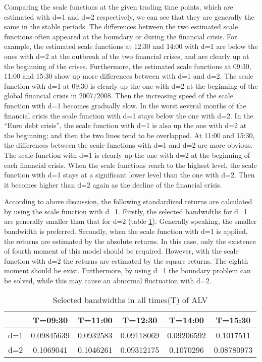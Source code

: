 Comparing the scale functions at the given trading time points, which are estimated with d=1 and d=2 respectively, we can see that they are generally the same in the stable periods. The differences between the two estimated scale functions often appeared at the boundary or during the financial crisis. For example, the estimated scale functions at 12:30 and 14:00 with d=1 are below the ones with d=2 at the outbreak of the two financial crises, and are clearly up at the beginning of the crises. 
Furthermore, the estimated scale functions at 09:30, 11:00 and 15:30 show up more differences between with d=1 and d=2. The scale function with d=1 at 09:30 is clearly up the one with d=2 at the beginning of the global financial crisis in 2007/2008. Then the increasing speed of the scale function with d=1 becomes gradually slow. In the worst several months of the financial crisis the scale function with d=1 stays below the one with d=2. In the ``Euro debt crisis'', the scale function with d=1 is also up the one with d=2 at the beginning; and then the two lines tend to be overlapped. At 11:00 and 15:30, the differences between the scale functions with d=1 and d=2 are more obvious. The scale function with d=1 is clearly up the one with d=2 at the beginning of each financial crisis. When the scale functions reach to the highest level, the scale function with d=1 stays at a significant lower level than the one with d=2. Then it becomes higher than d=2 again as the decline of the financial crisis.

According to above discussion, the following standardized returns are calculated by using the scale function with d=1. Firstly, the selected bandwidths for d=1 are generally smaller than that for d=2 (table \ref{tab:bandwidthALV}). Generally speaking, the smaller bandwidth is preferred. Secondly, when the scale function with d=1 is applied, the returns are estimated by the absolute returns. In this case, only the existence of fourth moment of this model should be required. However, with the scale function with d=2 the returns are estimated by the square returns. The eighth moment should be exist. Furthermore, by using d=1 the boundary problem can be solved, while this may cause an abnormal fluctuation with d=2.


\begin{table}[!h]
 \small
  \centering
  \vspace{2ex} 
\begin{tabular}{c|c|c|c|c|c}
\toprule
    &T=09:30&T=11:00&T=12:30&T=14:00&T=15:30 \\
\midrule
\hline
d=1	&0.09845639	& 0.0932583		&0.09118069	& 0.09206592  &	0.1017511\\
d=2	&0.1069041	& 0.1046261		&0.09312175	& 0.1070296	  &   0.08780973\\
\bottomrule

\end{tabular}
  \caption{Selected bandwidths in all times(T) of ALV}
  \label{tab:bandwidthALV}
\end{table}

